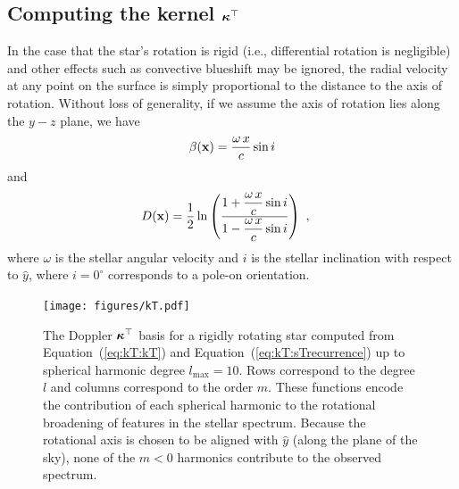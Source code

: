 \documentclass[modern]{aastex631}
\begin{document}
\subsection{Computing the kernel $\boldsymbol{\kappa}^\top$}
\label{sec:kT}
%
In the case that the star's rotation is rigid (i.e., differential rotation is negligible) and other effects such as convective blueshift may be ignored, the radial velocity at any point on the surface is simply proportional to the distance to the axis of rotation. 
Without loss of generality, if we assume the axis of rotation lies along the $y-z$ plane, we have
%
\begin{align}
    \label{eq:kT:beta}
    \beta({\mathbf{x}}) = \frac{\omega \, x}{c} \sin i
\end{align}
%
and
%
\begin{align}
    \label{eq:kT:D}
    D({\mathbf{x}}) & =
    \frac{1}{2}\ln\left(
    \dfrac{1 + \dfrac{\omega \, x}{c} \sin i}
    {1 - \dfrac{\omega \, x}{c} \sin i}
    \right)
    \hskip 0.33em ,
\end{align}
%
where $\omega$ is the stellar angular velocity and $i$ is the stellar inclination with respect to $\hat{y}$, where $i = 0^\circ$ corresponds to a pole-on orientation.

\begin{figure}[t!]
    \begin{centering}
        \texttt{[image: figures/kT.pdf]}
        \caption{%
            The Doppler $\boldsymbol{\kappa}^\top$ basis for a rigidly rotating star computed from Equation~(\ref{eq:kT:kT}) and Equation~(\ref{eq:kT:sTrecurrence}) up to spherical harmonic degree $l_\mathrm{max}=10$. 
            Rows correspond to the degree $l$ and columns correspond to the order $m$. 
            These functions encode the contribution of each spherical harmonic to the rotational broadening of features in the stellar spectrum. 
            Because the rotational axis is chosen to be aligned with $\hat{y}$ (along the plane of the sky), none of the $m < 0$ harmonics contribute to the observed spectrum.
        }
        \label{fig:kT}
    \end{centering}
\end{figure}
\end{document}
